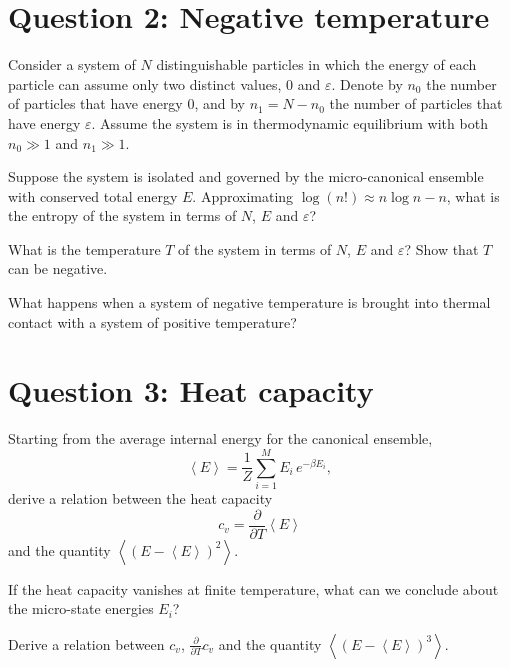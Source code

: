 \documentclass[12 pt]{article} %
\newcommand{\be}{\ensuremath{\beta} }
\newcommand{\eps}{\ensuremath{\varepsilon} }
\newcommand{\vev}[1]{\ensuremath{\left\langle #1 \right\rangle} }
\newcommand{\pderiv}[2]{\ensuremath{\frac{\partial #1}{\partial #2}} }
\newcommand{\showmarks}[1]{\rightline{\texttt{[#1 marks]}}} %
\begin{document}



\vfill
\section*{Question 2: Negative temperature}
Consider a system of $N$ distinguishable particles in which the energy of each particle can assume only two distinct values, $0$ and $\eps$.
Denote by $n_0$ the number of particles that have energy $0$, and by $n_1 = N - n_0$ the number of particles that have energy $\eps$.
Assume the system is in thermodynamic equilibrium with both $n_0 \gg 1$ and $n_1 \gg 1$.

Suppose the system is isolated and governed by the micro-canonical ensemble with conserved total energy $E$.
Approximating $\log(n!) \approx n\log n - n$, what is the entropy of the system in terms of $N$, $E$ and $\eps$?

\showmarks{10}

What is the temperature $T$ of the system in terms of $N$, $E$ and $\eps$?
Show that $T$ can be negative.

\showmarks{10}

What happens when a system of negative temperature is brought into thermal contact with a system of positive temperature?

\showmarks{10}



\vfill
\section*{Question 3: Heat capacity}
Starting from the average internal energy for the canonical ensemble,
\begin{equation*}
  \vev{E} = \frac{1}{Z} \sum_{i = 1}^M E_i \, e^{-\be E_i},
\end{equation*}
derive a relation between the heat capacity
\begin{equation*}
  c_v = \pderiv{}{T} \vev{E}
\end{equation*}
and the quantity $\vev{\left(E - \vev{E}\right)^2}$.

\showmarks{15}

If the heat capacity vanishes at finite temperature, what can we conclude about the micro-state energies $E_i$?

\showmarks{5}

Derive a relation between $c_v$, $\pderiv{}{T} c_v$ and the quantity $\vev{\left(E - \vev{E}\right)^3}$.

\showmarks{15}



\end{document}
